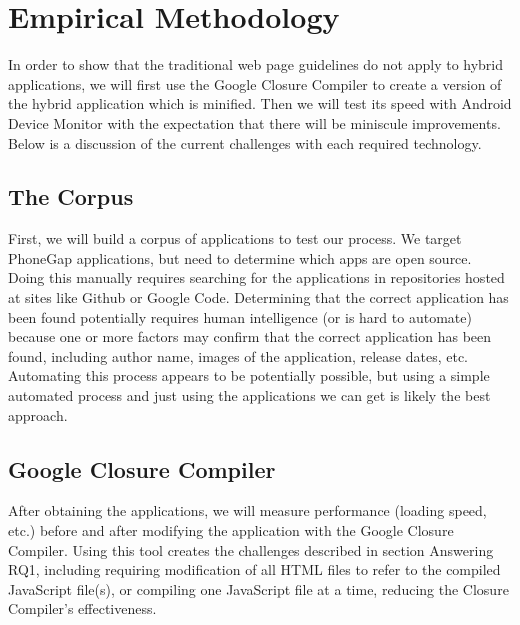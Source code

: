 \documentclass{acm_proc_article-sp}
\begin{document}
\section{Empirical Methodology}
In order to show that the traditional web page guidelines do not apply to hybrid applications, we will first use the Google Closure Compiler to create a version of the hybrid application which is minified.
Then we will test its speed with Android Device Monitor with the expectation that there will be miniscule improvements.
Below is a discussion of the current challenges with each required technology.

\subsection{The Corpus}
First, we will build a corpus of applications to test our process. 
We target PhoneGap applications, but need to determine which apps are open source. 
Doing this manually requires searching for the applications in repositories hosted at sites like Github or Google Code.
Determining that the correct application has been found potentially requires human intelligence (or is hard to automate) because one or more factors may confirm that the correct application has been found, including author name, images of the application, release dates, etc.
Automating this process appears to be potentially possible, but using a simple automated process and just using the applications we can get is likely the best approach.

\subsection{Google Closure Compiler}
After obtaining the applications, we will measure performance (loading speed, etc.) before and after modifying the application with the Google Closure Compiler. 
Using this tool creates the challenges described in section Answering RQ1, including requiring modification of all HTML files to refer to the compiled JavaScript file(s), or compiling one JavaScript file at a time, reducing the Closure Compiler's effectiveness. 
\end{document}
